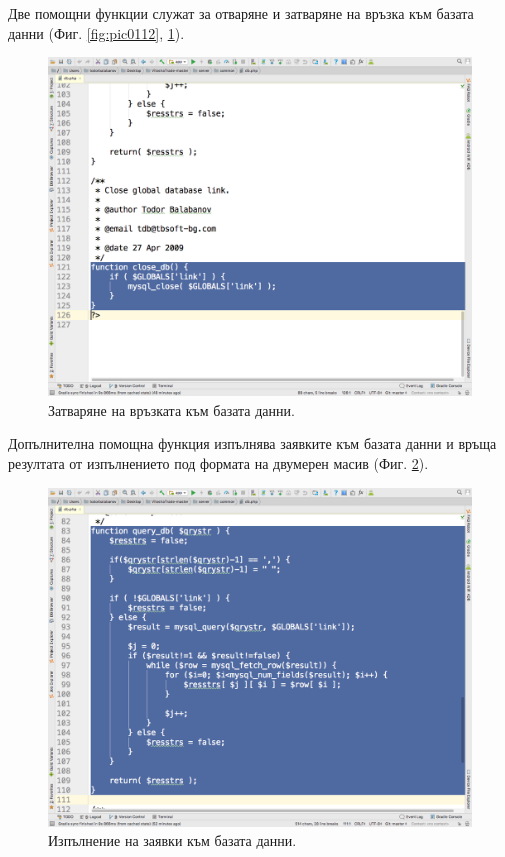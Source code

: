 \documentclass[book,14pt,oneside,openany]{memoir}
\begin{document}
Две помощни функции служат за отваряне и затваряне на връзка към базата данни (Фиг. \ref{fig:pic0112}, \ref{fig:pic0113}).

\begin{figure}[h]
  \centering
  \includegraphics[height=0.45\pdfpageheight]{pic0113}
  \caption{Затваряне на връзката към базата данни.}
\label{fig:pic0113}
\end{figure}
\FloatBarrier

Допълнителна помощна функция изпълнява заявките към базата данни и връща резултата от изпълнението под формата на двумерен масив (Фиг. \ref{fig:pic0114}).

\begin{figure}[h]
  \centering
  \includegraphics[height=0.45\pdfpageheight]{pic0114}
  \caption{Изпълнение на заявки към базата данни.}
\label{fig:pic0114}
\end{figure}
\FloatBarrier
\end{document}
